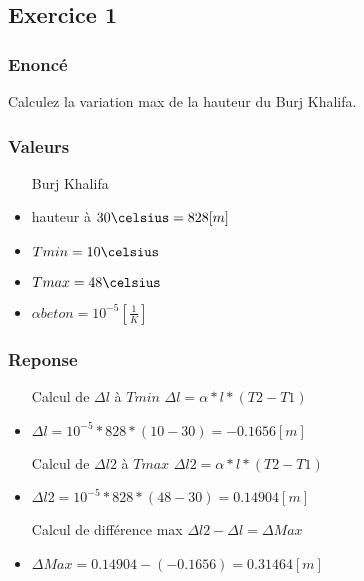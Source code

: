 
\subsection{Exercice 1}
\subsubsection{Enoncé}
Calculez la variation max de la hauteur du Burj Khalifa.
\subsubsection{Valeurs}
\begin{itemize}
    \item[Burj Khalifa]
    \item hauteur à $30\celsius = 828[m]$
    \item $Tmin = 10\celsius$
    \item $Tmax = 48\celsius$
    \item ${\alpha}beton = 10^{-5}[\frac{1}{K}]$
\end{itemize}
\subsubsection{Reponse}
\begin{itemize}
    \item[Calcul de ${\Delta}l$ à $Tmin$] ${\Delta}l = \alpha * l * (T2-T1)$
    \item ${\Delta}l = 10^{-5} * 828 * (10-30) = -0.1656[m]$
    \item[Calcul de ${\Delta}l2$ à $Tmax$] ${\Delta}l2 = \alpha * l * (T2-T1)$
    \item ${\Delta}l2 = 10^{-5} * 828 * (48-30) = 0.14904[m]$
    \item[Calcul de différence max] ${\Delta}l2 - {\Delta}l = {\Delta}Max$
    \item ${\Delta}Max = 0.14904 - (-0.1656) = 0.31464 [m]$
\end{itemize}
